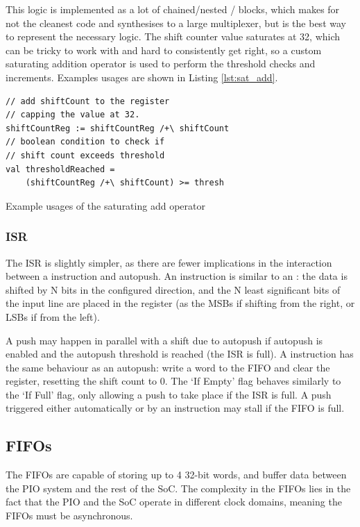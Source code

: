 This logic is implemented as a lot of chained/nested / blocks, which makes for not the cleanest code and synthesises to a large multiplexer, but is the best way to represent the necessary logic. The shift counter value saturates at 32, which can be tricky to work with and hard to consistently get right, so a custom saturating addition operator \txt{/+|} is used to perform the threshold checks and increments. Examples usages are shown in Listing \ref{lst:sat_add}.


\begin{listing}[h!]
    \vspace{0.5cm}
    \begin{verbatim}
// add shiftCount to the register
// capping the value at 32.
shiftCountReg := shiftCountReg /+\ shiftCount
// boolean condition to check if 
// shift count exceeds threshold
val thresholdReached = 
    (shiftCountReg /+\ shiftCount) >= thresh
    \end{verbatim}
    \caption{Example usages of the saturating add operator}
    \label{lst:sat_add}
\end{listing}

\subsubsection{ISR}

The ISR is slightly simpler, as there are fewer implications in the interaction between a  instruction and autopush. An  instruction is similar to an : the data is shifted by N bits in the configured direction, and the N least significant bits of the input line are placed in the register (as the MSBs if shifting from the right, or LSBs if from the left).

A push may happen in parallel with a shift due to autopush if autopush is enabled and the autopush threshold is reached (the ISR is full). A  instruction has the same behaviour as an autopush: write a word to the FIFO and clear the register, resetting the shift count to 0. The `If Empty' flag behaves similarly to the `If Full' flag, only allowing a push to take place if the ISR is full. A push triggered either automatically or by an instruction may stall if the FIFO is full.

\subsection{FIFOs}

The FIFOs are capable of storing up to 4 32-bit words, and buffer data between the PIO system and the rest of the SoC. The complexity in the FIFOs lies in the fact that the PIO and the SoC operate in different clock domains, meaning the FIFOs must be asynchronous.

